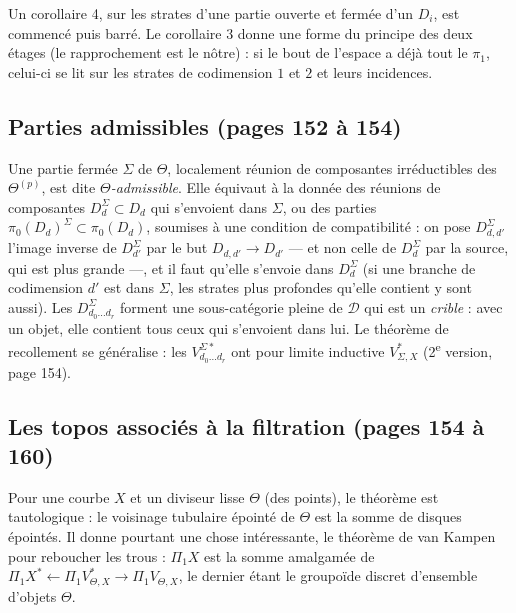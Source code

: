 \documentclass[11pt,a4paper]{article}
\begin{document}
Un corollaire 4, sur les strates d'une partie ouverte et fermée d'un $D_i$,
est commencé puis barré. Le corollaire 3 donne une forme du principe des deux
étages (le rapprochement est le nôtre) : si le bout de l'espace a
déjà tout le $\pi_1$, celui-ci se lit sur les strates de codimension $1$ et $2$ et
leurs incidences.

\subsection*{Parties admissibles (pages 152 à 154)}

Une partie fermée $\Sigma$ de $\Theta$, localement réunion de composantes
irréductibles des $\Theta^{(p)}$, est dite \emph{$\Theta$-admissible}. Elle
équivaut à la donnée des réunions de composantes $D^{\Sigma}_d \subset D_d$ qui
s'envoient dans $\Sigma$, ou des parties $\pi_0(D_d)^\Sigma \subset \pi_0(D_d)$,
soumises à une condition de compatibilité : on pose $D^{\Sigma}_{d,d'}$ l'image
inverse de $D^{\Sigma}_{d'}$ par le but $D_{d,d'} \to D_{d'}$ — et non celle de
$D^{\Sigma}_d$ par la source, qui est plus grande —, et il faut qu'elle s'envoie
dans $D^{\Sigma}_d$ (si une branche de codimension $d'$ est dans $\Sigma$, les
strates plus profondes qu'elle contient y sont aussi). Les $D^{\Sigma}_{d_0 \dots
d_r}$ forment une sous-catégorie pleine de $\mathcal{D}$ qui est un \emph{crible} :
avec un objet, elle contient tous ceux qui s'envoient dans lui. Le théorème de
recollement se généralise : les $V^{\Sigma *}_{d_0 \dots d_r}$ ont pour limite
inductive $V^{*}_{\Sigma,X}$ (2\textsuperscript{e} version, page 154).

\subsection*{Les topos associés à la filtration (pages 154 à 160)}

Pour une courbe $X$ et un diviseur lisse $\Theta$ (des points), le théorème est
tautologique : le voisinage tubulaire épointé de $\Theta$ est la somme de disques
épointés. Il donne pourtant une chose intéressante, le théorème de van Kampen pour
reboucher les trous : $\Pi_1 X$ est la somme amalgamée de $\Pi_1 X^*
\leftarrow \Pi_1 V^{*}_{\Theta,X} \rightarrow \Pi_1 V_{\Theta,X}$, le dernier étant
le groupoïde discret d'ensemble d'objets $\Theta$.
\end{document}
